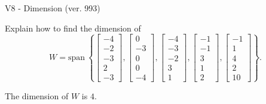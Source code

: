 \begin{exercise}
  \begin{exerciseTitle}V8 - Dimension (ver. 993)\end{exerciseTitle}
  \begin{exerciseStatement}
    Explain how to find the dimension of 
\[W=\mathrm{span}\ \left\{\left[\begin{array}{r}
-4 \\
-2 \\
-3 \\
2 \\
-3
\end{array}\right] , \left[\begin{array}{r}
0 \\
-3 \\
0 \\
0 \\
-4
\end{array}\right] , \left[\begin{array}{r}
-4 \\
-3 \\
-2 \\
3 \\
1
\end{array}\right] , \left[\begin{array}{r}
-1 \\
-1 \\
3 \\
1 \\
2
\end{array}\right] , \left[\begin{array}{r}
-1 \\
1 \\
4 \\
2 \\
10
\end{array}\right]\right\}.\]



  \end{exerciseStatement}
  \begin{exerciseAnswer}
   The dimension of \(W\) is  \(4\).
  


  \end{exerciseAnswer}
\end{exercise}